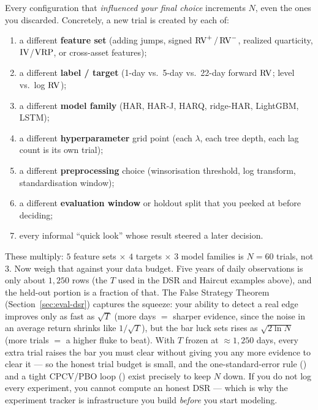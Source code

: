 \begin{keyidea}
Every configuration that \emph{influenced your final choice} increments $N$, even the ones you discarded. Concretely, a new trial is created by each of:
\begin{enumerate}[nosep]
  \item a different \textbf{feature set} (adding jumps, signed $\operatorname{RV}^{+}/\operatorname{RV}^{-}$, realized quarticity, $\operatorname{IV}$/$\operatorname{VRP}$, or cross-asset features);
  \item a different \textbf{label / target} (1-day vs.\ 5-day vs.\ 22-day forward $\operatorname{RV}$; level vs.\ log $\operatorname{RV}$);
  \item a different \textbf{model family} (HAR, HAR-J, HARQ, ridge-HAR, LightGBM, LSTM);
  \item a different \textbf{hyperparameter} grid point (each $\lambda$, each tree depth, each lag count is its own trial);
  \item a different \textbf{preprocessing} choice (winsorisation threshold, log transform, standardisation window);
  \item a different \textbf{evaluation window} or holdout split that you peeked at before deciding;
  \item every informal ``quick look'' whose result steered a later decision.
\end{enumerate}
These multiply: $5$ feature sets $\times$ $4$ targets $\times$ $3$ model families is $N = 60$ trials, not $3$.
Now weigh that against your data budget. Five years of daily observations is only about $1{,}250$ rows (the $T$ used in the DSR and Haircut examples above), and the held-out portion is a fraction of that.
The False Strategy Theorem (Section~\ref{sec:eval-dsr}) captures the squeeze: your ability to detect a real edge improves only as fast as $\sqrt{T}$ (more days $=$ sharper evidence, since the noise in an average return shrinks like $1/\sqrt{T}$), but the bar luck sets rises as $\sqrt{2\ln N}$ (more trials $=$ a higher fluke to beat).
With $T$ frozen at $\approx 1{,}250$ days, every extra trial raises the bar you must clear without giving you any more evidence to clear it --- so the honest trial budget is small, and the one-standard-error rule () and a tight CPCV/PBO loop () exist precisely to keep $N$ down.
If you do not log every experiment, you cannot compute an honest DSR --- which is why the experiment tracker is infrastructure you build \emph{before} you start modeling.
\end{keyidea}

